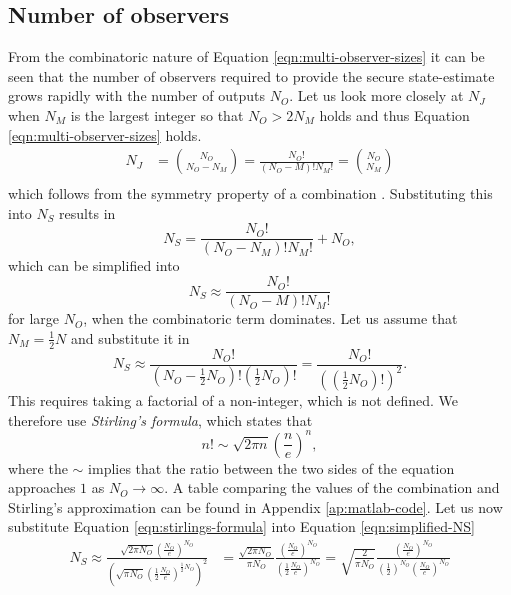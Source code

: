 \subsection{Number of observers}
From the combinatoric nature of Equation \eqref{eqn:multi-observer-sizes} it can be seen that the number of observers required to provide the secure state-estimate grows rapidly with the number of outputs $N_O$. Let us look more closely at $N_J$ when $N_M$ is the largest integer so that $N_O>2N_M$ holds and thus Equation \eqref{eqn:multi-observer-sizes} holds.
\begin{equation*}
    \begin{split}
        N_J &= \binom{N_O}{N_O-N_M}  = \frac{N_O!}{(N_O-M)!N_M!} = \binom{N_O}{N_M} \\
    \end{split}
\end{equation*}
which follows from the symmetry property of a combination \cite[Section 1.1]{Mazur2010Combinatorics:Tour}. Substituting this into $N_S$ results in
\begin{equation*}
    N_S = \frac{N_O!}{(N_O-N_M)!N_M!} + N_O,
\end{equation*}
which can be simplified into
\begin{equation*}
    N_S \approx \frac{N_O!}{(N_O-M)!N_M!}
\end{equation*}
for large $N_O$, when the combinatoric term dominates. Let us assume that $N_M=\frac{1}{2}N$ and substitute it in
\begin{equation}\label{eqn:simplified-NS}
    N_S \approx \frac{N_O!}{(N_O-\frac{1}{2}N_O)!(\frac{1}{2}N_O)!} = \frac{N_O!}{\left( \left( \frac{1}{2}N_O \right) ! \right)^2}.
\end{equation}
This requires taking a factorial of a non-integer, which is not defined. We therefore use \textit{Stirling's formula}\cite{Beals2012GammaZeta}, which states that
\begin{equation}\label{eqn:stirlings-formula}
    n! \sim \sqrt{2\pi n} \left( \frac{n}{e} \right)^n,
\end{equation}
where the $\sim$ implies that the ratio between the two sides of the equation approaches $1$ as $N_O \rightarrow \infty$. A table comparing the values of the combination and Stirling's approximation can be found in Appendix \ref{ap:matlab-code}. Let us now substitute Equation \eqref{eqn:stirlings-formula} into Equation \eqref{eqn:simplified-NS}
\begin{equation*}
    \begin{split}
        N_S \approx  \frac{\sqrt{2 \pi N_O}( \frac{N_O}{e} )^{N_O}}{\left( \sqrt{\pi N_O}(\frac{1}{2} \frac{N_O}{e} )^{\frac{1}{2}N_O} \right)^2} &= \frac{\sqrt{2 \pi N_O}}{\pi N_O} \frac{( \frac{N_O}{e} )^{N_O}}{(\frac{1}{2} \frac{N_O}{e} )^{N_O}} = \sqrt{\frac{2}{\pi N_O}} \frac{( \frac{N_O}{e} )^{N_O}}{(\frac{1}{2})^{N_O} (\frac{N_O}{e} )^{N_O}} \\
    \end{split}
\end{equation*}
